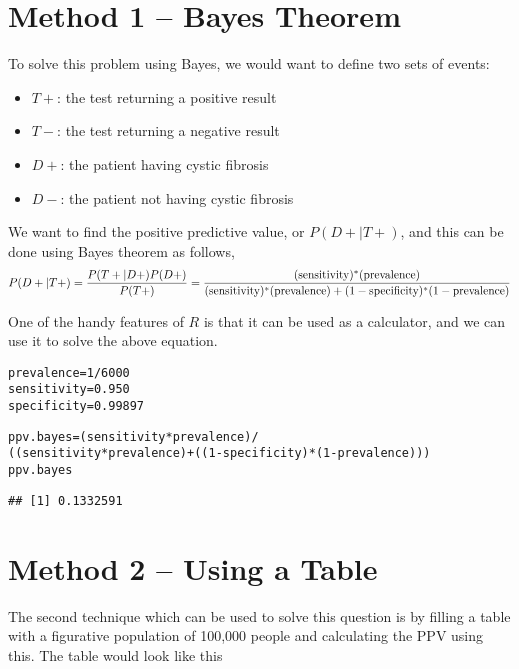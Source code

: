 \documentclass[11pt]{article}\usepackage[]{graphicx}\usepackage[]{color}
\makeatletter
\newcommand{\hlnum}[1]{\textcolor[rgb]{0.686,0.059,0.569}{#1}}%
\newcommand{\hlopt}[1]{\textcolor[rgb]{0,0,0}{#1}}%
\newcommand{\hlstd}[1]{\textcolor[rgb]{0.345,0.345,0.345}{#1}}%
\newcommand{\hlkwb}[1]{\textcolor[rgb]{0.69,0.353,0.396}{#1}}%
\newenvironment{kframe}{%
 \def\at@end@of@kframe{}%
 \ifinner\ifhmode%
  \def\at@end@of@kframe{\end{minipage}}%
  \begin{minipage}{\columnwidth}%
 \fi\fi%
 \def\FrameCommand##1{\hskip\@totalleftmargin \hskip-\fboxsep
 \colorbox{shadecolor}{##1}\hskip-\fboxsep
     \hskip-\linewidth \hskip-\@totalleftmargin \hskip\columnwidth}%
 \MakeFramed {\advance\hsize-\width
   \@totalleftmargin\z@ \linewidth\hsize
   \@setminipage}}%
 {\par\unskip\endMakeFramed%
 \at@end@of@kframe}
\newenvironment{knitrout}{}{} %
\makeatother
\begin{document}
\section{Method 1 -- Bayes Theorem}
To solve this problem using Bayes, we would want to define two sets of events: 
\begin{itemize}
\item $T+$: the test returning a positive result 
\item $T-$: the test returning a negative result 
\item $D+$: the patient having cystic fibrosis 
\item $D-$: the patient not having cystic fibrosis 
\end{itemize}

We want to find the positive predictive value, or $P(D+|T+)$, and this can be done using Bayes theorem as follows, 
$$ P(D+|T+) = \frac{P(T+|D+)P(D+)}{P(T+)} = \frac{(\textnormal{sensitivity})^*(\textnormal{prevalence})}{(\textnormal{sensitivity})^*(\textnormal{prevalence})+(1-\textnormal{specificity})^*(1-\textnormal{prevalence})}$$ 

One of the handy features of $R$ is that it can be used as a calculator, and we can use it to solve the above equation.  

\begin{knitrout}
\color{fgcolor}\begin{kframe}
\begin{alltt}
\hlstd{prevalence} \hlkwb{=} \hlnum{1}\hlopt{/}\hlnum{6000}
\hlstd{sensitivity} \hlkwb{=} \hlnum{0.950}
\hlstd{specificity} \hlkwb{=} \hlnum{0.99897}

\hlstd{ppv.bayes} \hlkwb{=} \hlstd{(sensitivity}\hlopt{*}\hlstd{prevalence)}\hlopt{/}
  \hlstd{((sensitivity}\hlopt{*}\hlstd{prevalence)}\hlopt{+}\hlstd{((}\hlnum{1}\hlopt{-}\hlstd{specificity)}\hlopt{*}\hlstd{(}\hlnum{1}\hlopt{-}\hlstd{prevalence)))}
\hlstd{ppv.bayes}
\end{alltt}
\begin{verbatim}
## [1] 0.1332591
\end{verbatim}
\end{kframe}
\end{knitrout}


\section{Method 2 -- Using a Table}
The second technique which can be used to solve this question is by filling a table with a figurative population of 100,000 people and calculating the PPV using this.  The table would look like this
\end{document}
